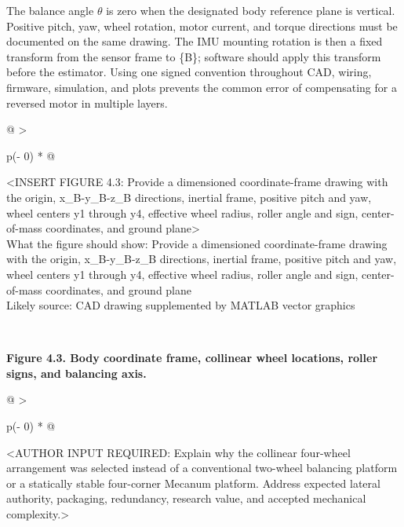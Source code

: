 The balance angle \ensuremath{\theta} is zero when the designated body reference plane is
vertical. Positive pitch, yaw, wheel rotation, motor current, and torque
directions must be documented on the same drawing. The IMU mounting
rotation is then a fixed transform from the sensor frame to \{B\};
software should apply this transform before the estimator. Using one
signed convention throughout CAD, wiring, firmware, simulation, and
plots prevents the common error of compensating for a reversed motor in
multiple layers.

\begin{longtable}[]{@{}
  >{\raggedright\arraybackslash}p{(\columnwidth - 0\tabcolsep) * }@{}}
\toprule\noalign{}
\begin{minipage}[b]{\linewidth}\raggedright
\textless INSERT FIGURE 4.3: Provide a dimensioned coordinate-frame
drawing with the origin, x\_B-y\_B-z\_B directions, inertial frame,
positive pitch and yaw, wheel centers y1 through y4, effective wheel
radius, roller angle and sign, center-of-mass coordinates, and ground
plane\textgreater{}\\
What the figure should show: Provide a dimensioned coordinate-frame
drawing with the origin, x\_B-y\_B-z\_B directions, inertial frame,
positive pitch and yaw, wheel centers y1 through y4, effective wheel
radius, roller angle and sign, center-of-mass coordinates, and ground
plane\\
Likely source: CAD drawing supplemented by MATLAB vector graphics\strut
\end{minipage} \\
\midrule\noalign{}
\endhead
\bottomrule\noalign{}
\endlastfoot
\end{longtable}

\begin{center}\singlespacing
{}
\textbf{Figure 4.3. Body coordinate frame, collinear wheel locations, roller signs, and balancing axis.}
\end{center}

\begin{longtable}[]{@{}
  >{\raggedright\arraybackslash}p{(\columnwidth - 0\tabcolsep) * }@{}}
\toprule\noalign{}
\begin{minipage}[b]{\linewidth}\raggedright
\textless AUTHOR INPUT REQUIRED: Explain why the collinear four-wheel
arrangement was selected instead of a conventional two-wheel balancing
platform or a statically stable four-corner Mecanum platform. Address
expected lateral authority, packaging, redundancy, research value, and
accepted mechanical complexity.\textgreater{}
\end{minipage} \\
\midrule\noalign{}
\endhead
\bottomrule\noalign{}
\endlastfoot
\end{longtable}

